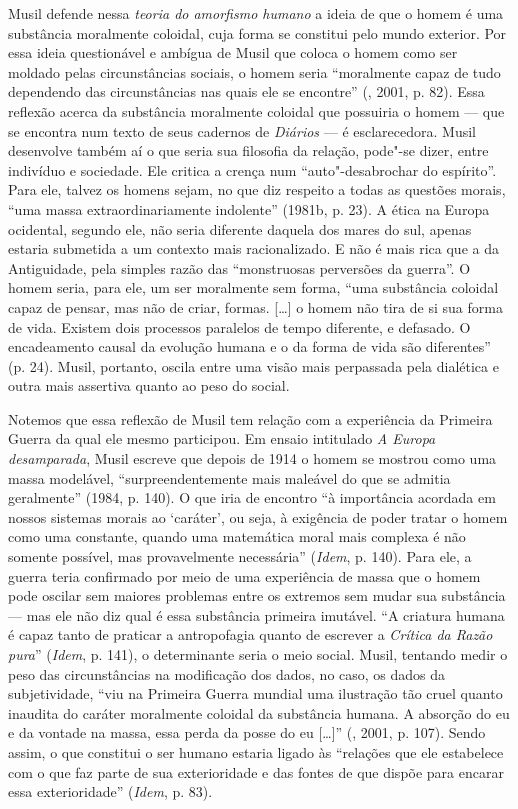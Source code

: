 Musil defende nessa \emph{teoria do amorfismo humano} a ideia de que o
homem é uma substância moralmente coloidal, cuja forma se constitui pelo
mundo exterior. Por essa ideia questionável e ambígua de Musil que
coloca o homem como ser moldado pelas circunstâncias sociais, o homem
seria ``moralmente capaz de tudo dependendo das circunstâncias nas quais
ele se encontre'' (, 2001, p. 82). Essa reflexão acerca da
substância moralmente coloidal que possuiria o homem --- que se encontra
num texto de seus cadernos de \emph{Diários} --- é esclarecedora. Musil
desenvolve também aí o que seria sua filosofia da relação, pode"-se
dizer, entre indivíduo e sociedade. Ele critica a crença num
``auto"-desabrochar do espírito''. Para ele, talvez os homens sejam, no
que diz respeito a todas as questões morais, ``uma massa
extraordinariamente indolente'' (1981b, p. 23). A ética na Europa
ocidental, segundo ele, não seria diferente daquela dos mares do sul,
apenas estaria submetida a um contexto mais racionalizado. E não é mais
rica que a da Antiguidade, pela simples razão das ``monstruosas
perversões da guerra''. O homem seria, para ele, um ser moralmente sem
forma, ``uma substância coloidal capaz de pensar, mas não de criar,
formas. [\ldots{}] o homem não tira de si sua forma de vida. Existem
dois processos paralelos de tempo diferente, e defasado. O encadeamento
causal da evolução humana e o da forma de vida são diferentes'' (p.
24). Musil, portanto, oscila entre uma visão mais perpassada pela
dialética e outra mais assertiva quanto ao peso do social.

Notemos que essa reflexão de Musil tem relação com a experiência
da Primeira Guerra da qual ele mesmo participou. Em ensaio intitulado
\emph{A Europa desamparada}, Musil escreve que depois de 1914 o homem se
mostrou como uma massa modelável, ``surpreendentemente mais maleável do
que se admitia geralmente'' (1984, p. 140). O que iria de encontro ``à
importância acordada em nossos sistemas morais ao `caráter', ou seja, à
exigência de poder tratar o homem como uma constante, quando uma
matemática moral mais complexa é não somente possível, mas provavelmente
necessária'' (\emph{Idem}, p. 140). Para ele, a guerra teria confirmado
por meio de uma experiência de massa que o homem pode oscilar sem
maiores problemas entre os extremos sem mudar sua substância --- mas ele
não diz qual é essa substância primeira imutável. ``A criatura humana é
capaz tanto de praticar a antropofagia quanto de escrever a
\emph{Crítica da Razão pura}'' (\emph{Idem}, p. 141), o determinante
seria o meio social. Musil, tentando medir o peso das circunstâncias na
modificação dos dados, no caso, os dados da subjetividade, ``viu na
Primeira Guerra mundial uma ilustração tão cruel quanto inaudita do
caráter moralmente coloidal da substância humana. A absorção do eu e da
vontade na massa, essa perda da posse do eu [\ldots{}]'' (,
2001, p. 107). Sendo assim, o que constitui o ser humano estaria ligado
às ``relações que ele estabelece com o que faz parte de sua
exterioridade e das fontes de que dispõe para encarar essa
exterioridade'' (\emph{Idem}, p. 83).

